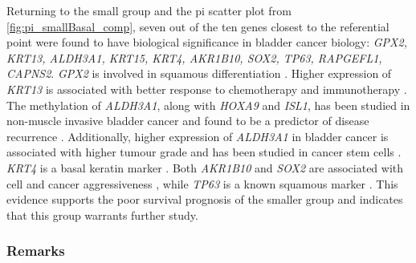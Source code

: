 Returning to the small group and the pi scatter plot from \cref{fig:pi_smallBasal_comp},
seven out of the ten genes closest to the referential point were found to have biological significance in bladder cancer biology: \textit{GPX2, KRT13, ALDH3A1, KRT15, KRT4, AKR1B10, SOX2, TP63, RAPGEFL1, CAPNS2}. \textit{GPX2} is involved in squamous differentiation \citet{Naiki2018-fp}. Higher expression of \textit{KRT13} is associated with better response to chemotherapy and immunotherapy \citet{Yu2023-db}. The methylation of \textit{ALDH3A1}, along with \textit{HOXA9} and \textit{ISL1}, has been studied in non-muscle invasive bladder cancer and found to be a predictor of disease recurrence \citet{McLean2023-qk}. Additionally, higher expression of \textit{ALDH3A1} in bladder cancer is associated with higher tumour grade and has been studied in cancer stem cells \citet{Kim2013-th}. \textit{KRT4} is a basal keratin marker \citet{Marzouka2018-ge}. Both \textit{AKR1B10} and \textit{SOX2} are associated with cell and cancer aggressiveness \citet{Huang2021-bn, Chiu2020-xh}, while \textit{TP63} is a known squamous marker \citet{Robertson2017-mg}. This evidence supports the poor survival prognosis of the smaller group and indicates that this group warrants further study.


\subsubsection{Remarks}

